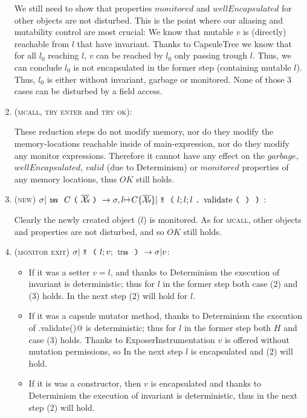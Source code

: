 \begin{enumerate}
We still need to show that properties $\mathit{monitored}$ and $\mathit{wellEncapsulated}$
 for other objects are
not disturbed. This is the point where our aliasing and mutability control are most crucial:
We know that mutable $v$ is (directly) reachable from
$l$ that have invariant.
Thanks to CapsuleTree we know that for all $l_0$ reaching $l$,
$v$ can be reached by $l_0$ only passing trough $l$.
Thus, we can conclude  $l_0$ is not encapsulated in the former step (containing mutable $l$).
Thus, $l_0$ is either without invariant, garbage or monitored.
None of those 3 cases can be disturbed by a field access.


\item (\textsc{mcall}, \textsc{try enter} and \textsc{try ok}):

These reduction steps do not modify memory, nor do they modify the memory-locations reachable inside of main-expression, nor do they modify any monitor expressions. Therefore it cannot have any effect on the $garbage$, $wellEncapsulated$, $valid$ (due to Determinism) or $monitored$ properties of any memory locations, thus $\mathit{OK}$ still holds.

\item (\textsc{new}) $\sigma|\Kw{new}\ C\oR\vs\cR\rightarrow \sigma,l\mapsto C\{\vs\}| \Kw{M}\oR l;l;l\singleDot\text{validate}\oR\cR\cR$:


Clearly the newly created object ($l$) is monitored. As for \textsc{mcall}, other objects and properties are not disturbed, and so $\mathit{OK}$ still holds.


\item (\textsc{monitor exit}) $\sigma|\Kw{M}\oR l; v;\Kw{true}\cR\rightarrow \sigma|v$:

\begin{itemize}
\item
    If it was a setter $v = l$, and 
    thanks to Determinism the execution of invariant is deterministic;
    thus for $l$ in the former step both case (2) and (3) holds.
    In the next step (2) will hold for $l$.
\item
    If it was a capsule mutator method, thanks to Determinism the execution
 of \Q@.validate()@ is deterministic;
    thus for $l$ in the former step both $H$ and case (3) holds.
    Thanks to ExposerInstrumentation $v$ is offered without mutation permissions, so
    In the next step $l$ is encapsulated and (2) will hold.
\item
    If it is was a constructor, 
    then $v$ is encapsulated and thanks to Determinism
    the execution of invariant is deterministic, thus in the next step (2) will hold.
\end{itemize}



\end{enumerate}
